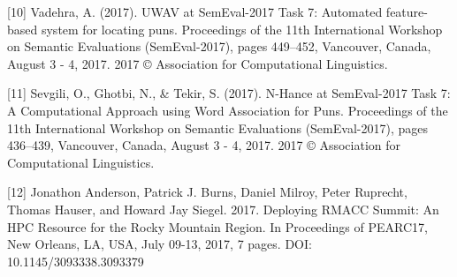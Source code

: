 \documentclass{article}
\begin{document}
[10] Vadehra, A. (2017). UWAV at SemEval-2017 Task 7: Automated feature-based
system for locating puns. Proceedings of the 11th International Workshop on
Semantic Evaluations (SemEval-2017), pages 449–452, Vancouver, Canada, August 3
- 4, 2017. 2017 © Association for Computational Linguistics.

[11] Sevgili, O., Ghotbi, N., \& Tekir, S. (2017). N-Hance at SemEval-2017 Task
7: A Computational Approach using Word Association for Puns. Proceedings of the
11th International Workshop on Semantic Evaluations (SemEval-2017), pages
436–439, Vancouver, Canada, August 3 - 4, 2017. 2017 © Association for
Computational Linguistics.

[12] Jonathon Anderson, Patrick J. Burns, Daniel Milroy, Peter Ruprecht, Thomas Hauser, and Howard Jay Siegel. 2017. Deploying RMACC Summit: An HPC Resource for the Rocky Mountain Region. In Proceedings of PEARC17, New Orleans, LA, USA, July 09-13, 2017, 7 pages. DOI: 10.1145/3093338.3093379
\end{document}
